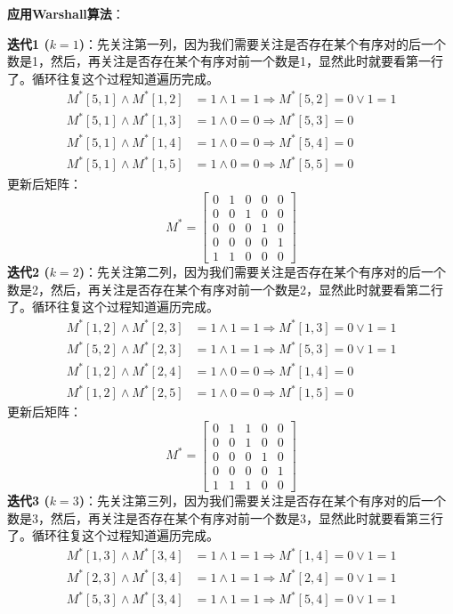 \documentclass[lang=cn,11pt]{elegantbook}
\begin{document}
\textbf{应用Warshall算法}：

\textbf{迭代1 ($k=1$)}：先关注第一列，因为我们需要关注是否存在某个有序对的后一个数是1，然后，再关注是否存在某个有序对前一个数是1，显然此时就要看第一行了。循环往复这个过程知道遍历完成。
\begin{align*}
M^*[5,1] \land M^*[1,2] &= 1 \land 1 = 1 \Rightarrow M^*[5,2] = 0 \lor 1 = 1 \\
M^*[5,1] \land M^*[1,3] &= 1 \land 0 = 0 \Rightarrow M^*[5,3] = 0 \\
M^*[5,1] \land M^*[1,4] &= 1 \land 0 = 0 \Rightarrow M^*[5,4] = 0 \\
M^*[5,1] \land M^*[1,5] &= 1 \land 0 = 0 \Rightarrow M^*[5,5] = 0
\end{align*}
更新后矩阵：
\[
M^* = \begin{bmatrix}
0 & 1 & 0 & 0 & 0 \\
0 & 0 & 1 & 0 & 0 \\
0 & 0 & 0 & 1 & 0 \\
0 & 0 & 0 & 0 & 1 \\
1 & 1 & 0 & 0 & 0
\end{bmatrix}
\]
\textbf{迭代2 ($k=2$)}：先关注第二列，因为我们需要关注是否存在某个有序对的后一个数是2，然后，再关注是否存在某个有序对前一个数是2，显然此时就要看第二行了。循环往复这个过程知道遍历完成。
\begin{align*}
M^*[1,2] \land M^*[2,3] &= 1 \land 1 = 1 \Rightarrow M^*[1,3] = 0 \lor 1 = 1 \\
M^*[5,2] \land M^*[2,3] &= 1 \land 1 = 1 \Rightarrow M^*[5,3] = 0 \lor 1 = 1 \\
M^*[1,2] \land M^*[2,4] &= 1 \land 0 = 0 \Rightarrow M^*[1,4] = 0 \\
M^*[1,2] \land M^*[2,5] &= 1 \land 0 = 0 \Rightarrow M^*[1,5] = 0
\end{align*}
更新后矩阵：
\[
M^* = \begin{bmatrix}
0 & 1 & 1 & 0 & 0 \\
0 & 0 & 1 & 0 & 0 \\
0 & 0 & 0 & 1 & 0 \\
0 & 0 & 0 & 0 & 1 \\
1 & 1 & 1 & 0 & 0
\end{bmatrix}
\]
\textbf{迭代3 ($k=3$)}：先关注第三列，因为我们需要关注是否存在某个有序对的后一个数是3，然后，再关注是否存在某个有序对前一个数是3，显然此时就要看第三行了。循环往复这个过程知道遍历完成。
\begin{align*}
M^*[1,3] \land M^*[3,4] &= 1 \land 1 = 1 \Rightarrow M^*[1,4] = 0 \lor 1 = 1 \\
M^*[2,3] \land M^*[3,4] &= 1 \land 1 = 1 \Rightarrow M^*[2,4] = 0 \lor 1 = 1 \\
M^*[5,3] \land M^*[3,4] &= 1 \land 1 = 1 \Rightarrow M^*[5,4] = 0 \lor 1 = 1
\end{align*}
\end{document}
